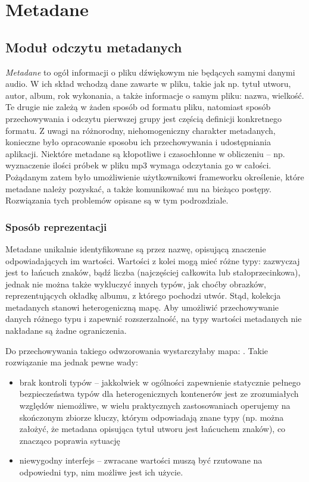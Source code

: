 \chapter{Metadane}
\section{Moduł odczytu metadanych}
\label{sec:metadane}

\emph{Metadane} to ogół informacji o pliku dźwiękowym nie będących samymi danymi audio. W ich skład
wchodzą dane zawarte w pliku, takie jak np. tytuł utworu, autor, album, rok wykonania, a także
informacje o samym pliku: nazwa, wielkość. Te drugie nie zależą w żaden sposób od formatu pliku,
natomiast sposób przechowywania i odczytu pierwszej grupy jest częścią definicji konkretnego
formatu. Z uwagi na różnorodny, niehomogeniczny charakter metadanych, konieczne było opracowanie
sposobu ich przechowywania i udostępniania aplikacji. Niektóre metadane są kłopotliwe i czasochłonne
w obliczeniu -- np. wyznaczenie ilości próbek w pliku mp3 wymaga odczytania go w całości. Pożądanym
zatem było umożliwienie użytkownikowi frameworku określenie, które metadane należy pozyskać, a także
komunikować mu na bieżąco postępy. Rozwiązania tych problemów opisane są w tym podrozdziale.

\subsection{Sposób reprezentacji}

Metadane unikalnie identyfikowane są przez nazwę, opisującą znaczenie odpowiadających im wartości.
Wartości z kolei mogą mieć różne typy: zazwyczaj jest to łańcuch znaków, bądź liczba (najczęściej
całkowita lub stałoprzecinkowa), jednak nie można także wykluczyć innych typów, jak choćby obrazków,
reprezentujących okładkę albumu, z którego pochodzi utwór. Stąd, kolekcja metadanych stanowi
heterogeniczną mapę. Aby umożliwić przechowywanie danych różnego typu i zapewnić rozszerzalność, na
typy wartości metadanych nie nakładane są żadne ograniczenia.

Do przechowywania takiego odwzorowania wystarczyłaby mapa: . Takie
rozwiązanie ma jednak pewne wady:

\begin{itemize}

  \item brak kontroli typów -- jakkolwiek w ogólności zapewnienie statycznie pełnego bezpieczeństwa
    typów dla heterogenicznych kontenerów jest ze zrozumiałych względów niemożliwe, w wielu
    praktycznych zastosowaniach operujemy na skończonym zbiorze kluczy, którym odpowiadają znane
    typy (np. można założyć, że metadana opisująca tytuł utworu jest łańcuchem znaków), co znacząco
    poprawia sytuację

  \item niewygodny interfejs -- zwracane wartości muszą być rzutowane na odpowiedni typ, nim możliwe
    jest ich użycie.

\end{itemize}

